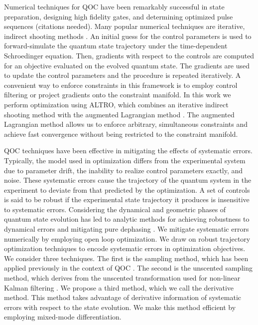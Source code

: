 \documentclass[
  amsfonts,
  amsmath,
  tbtags,
  amssymb,
  aps,
  nobibnotes,
  twocolumn,
  superscriptaddress,
]{revtex4-2}
\begin{document}
Numerical techniques for QOC have been remarkably successful in
state preparation, designing high fidelity gates, and determining
optimized pulse sequences (citations needed). Many popular numerical techniques
are iterative, indirect shooting
methods \cite{leung2017speedup, goer2019krotov, abdelhafez2019gradient,
  machnes2015gradient}.
An initial guess for the control parameters is used to forward-simulate
the quantum state trajectory under the time-dependent Schroedinger equation. Then, gradients
with respect to the controls are computed for an objective evaluated on
the evolved quantum state. The gradients are used to update
the control parameters and the procedure is repeated iteratively.
A convenient way to enforce constraints in this framework is
to employ control filtering or project gradients onto the constraint manifold.
In this work we perform optimization using ALTRO, which combines
an iterative indirect shooting method with the augmented Lagrangian
method \cite{howell2019altro}. The augmented Lagrangian method
allows us to enforce arbitrary, simultaneous constraints and achieve
fast convergence without being restricted to the constraint
manifold.

QOC techniques have been effective in mitigating the effects
of systematic errors. Typically, the model used in optimization
differs from the experimental system due to parameter drift, the inability
to realize control parameters exactly, and noise.
These systematic errors cause the trajectory of the quantum system
in the experiment to deviate from that predicted by the optimization.
A set of controls is said to be robust if the experimental state trajectory
it produces is insensitive to systematic errors.
Considering the dynamical and geometric phases of quantum state
evolution has led to analytic methods for achieving
robustness to dynamical errors and mitigating pure dephasing
\cite{han2020experimental, merrill2014progress, xu2020nonadiabatic, zhang2020universal}.
We mitigate systematic errors numerically by employing
open loop optimization. We draw on robust trajectory optimization
techniques to encode systematic errors in optimization objectives.
We consider three
techniques. The first is the sampling method, which has been applied
previously in the context of QOC
\cite{carvalho2020error, reinhold2019controlling, rembold2020introduction}.
The second is the unscented sampling
method, which derives from the unscented transformation used
for non-linear Kalman filtering
\cite{julier2004unscented, lee2013sigma, manchester2016derivative}.
We propose a third method, which we call the derivative method.
This method takes advantage of derivative information of systematic
errors with respect to the state evolution. We make this method efficient
by employing mixed-mode differentiation.
\end{document}
